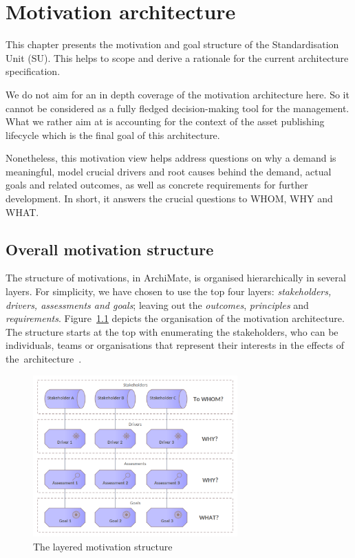 \chapter{Motivation architecture}
\label{sec:motivation-architecture}

	This chapter presents the motivation and goal structure of the Standardisation Unit (SU). This helps to scope and derive a rationale for the current architecture specification. 
	
	We do not aim for an in depth coverage of the motivation architecture here. So it cannot be considered as a fully fledged decision-making tool for the management. What we rather aim at is accounting for the context of the asset publishing lifecycle which is the final goal of this architecture. 
	
	Nonetheless, this motivation view helps address questions on why a demand is meaningful, model crucial drivers and root causes behind the demand, actual goals and related outcomes, as well as concrete requirements for further development. In short, it answers the crucial questions to WHOM, WHY and WHAT.
	
	\section{Overall motivation structure}
	\label{sec:how-to-motivation}		
	
	The structure of motivations, in ArchiMate, is organised hierarchically in several layers. For simplicity, we have chosen to use the top four layers: \textit{stakeholders, drivers, assessments and goals}; leaving out the \textit{outcomes}, \textit{principles} and \textit{requirements}. \mbox{Figure \ref{fig:morivation-structure}} depicts the organisation of the motivation architecture. The structure starts at the top with enumerating the stakeholders, who can be individuals, teams or organisations that represent their interests in the effects of \mbox{the architecture \citep{archimate3.1}}. 
	
	\begin{figure}[h]
		\centering
		\includegraphics[width=0.7\textwidth]{images/views/Motivation view.png}
		\caption{The layered motivation structure}
		\label{fig:morivation-structure}
	\end{figure}
	
